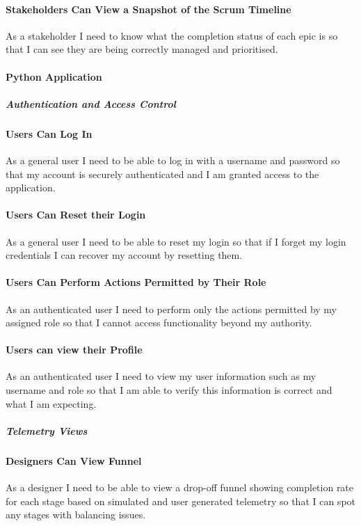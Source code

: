 \paragraph{Stakeholders Can View a Snapshot of the Scrum Timeline}
As a stakeholder I need to know what the completion status of each epic is so that I can see they are being correctly managed and prioritised.

\paragraph{Python Application}

\subparagraph{Authentication and Access Control}

\paragraph{Users Can Log In}
As a general user I need to be able to log in with a username and password so that my account is securely authenticated and I am granted access to the application.

\paragraph{Users Can Reset their Login}
As a general user I need to be able to reset my login so that if I forget my login credentials I can recover my account by resetting them.

\paragraph{Users Can Perform Actions Permitted by Their Role}
As an authenticated user I need to perform only the actions permitted by my assigned role so that I cannot access functionality beyond my authority.

\paragraph{Users can view their Profile}
As an authenticated user I need to view my user information such as my username and role so that I am able to verify this information is correct and what I am expecting.

\subparagraph{Telemetry Views}

\paragraph{Designers Can View Funnel}
As a designer I need to be able to view a drop-off funnel showing completion rate for each stage based on simulated and user generated telemetry so that I can spot any stages with balancing issues.


